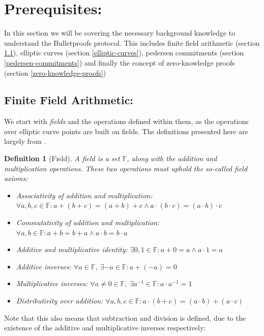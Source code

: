 \documentclass{article}
\newtheorem{definition}{Definition}[section]
\newcommand{\F}{\mathbb{F}}
\begin{document}
\section{Prerequisites:} \label{prerequisites}

In this section we will be covering the necessary background
knowledge to understand the Bulletproofs protocol. This includes
finite field arithmetic (section \ref{finite-field-arithmetic}),
elliptic curves (section \ref{elliptic-curves}), pedersen commitments
(section \ref{pedersen-commitments}) and finally the concept of
zero-knowledge proofs (section \ref{zero-knowledge-proofs})

\subsection{Finite Field Arithmetic:} \label{finite-field-arithmetic}

We start with \textit{fields} and the operations defined within them,
as the operations over elliptic curve points are built on fields. The
definitions presented here are largely from \cite{elliptic-curves}.

\begin{definition}[Field]
	A field is a set $\F$, along with the \textit{addition} and
	\textit{multiplication} operations. These two operations must
	uphold the so-called \textit{field axioms}:

	\begin{itemize}
		\item Associativity of addition and multiplication:
		$\forall a,b,c \in \F : a + (b + c) = (a + b) + c \land a \cdot (b \cdot c) = (a \cdot b) \cdot c$
		\item Commutativity of addition and multiplication:
		$\forall a,b \in \F : a+b=b+a \land a \cdot b = b \cdot a$
		\item Additive and multiplicative identity:
		$\exists 0,1 \in \F : a + 0 = a \land a \cdot 1 = a$
		\item Additive inverses:
		$\forall a \in \F,\ \exists {-a} \in \F : a + ({-a}) = 0$
		\item Multiplicative inverses:
		$\forall a \neq 0 \in \F,\  \exists a^{-1} \in \F : a \cdot a^{-1} = 1$
		\item Distributivity over addition:
		$\forall a,b,c \in \F : a \cdot (b + c) = (a \cdot b) + (a \cdot c)$
	\end{itemize}
\end{definition}

Note that this also means that subtraction and division is defined,
due to the existence of the additive and multiplicative inverses
respectively:
\end{document}
